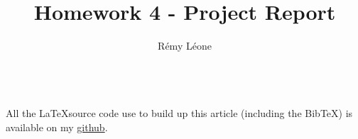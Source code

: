 \documentclass{sig-alternate}
\newcommand{\BibTeX}{{\sc Bib}\TeX}
\begin{document}
\title{Homework 4 - Project Report}


\author
{
  \alignauthor
    Rémy Léone\\
    \\
}

\maketitle














\appendix
\makeatletter
\def\@seccntformat#1{Appendix~\csname the#1\endcsname:\quad}
\makeatother

All the \LaTeX source code use to build up this 
article (including the \BibTeX) is available on my 
\href{https://github.com/sieben/upmc/tree/master/methodologie/final-homework5/report/}
{github}.

%
\end{document}
